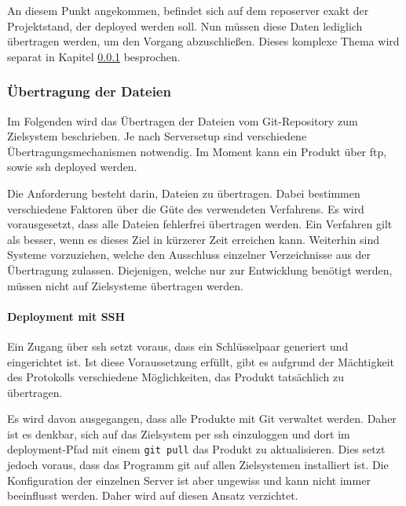 An diesem Punkt angekommen, befindet sich auf dem \gls{reposerver} exakt der Projektstand, der deployed werden soll. Nun müssen diese Daten lediglich übertragen werden, um den Vorgang abzuschließen. Dieses komplexe Thema wird separat in Kapitel \ref{ssub:uebertragung_der_dateien} besprochen.


\subsubsection{Übertragung der Dateien} %
\label{ssub:uebertragung_der_dateien}

Im Folgenden wird das Übertragen der Dateien vom Git-Repository zum Zielsystem beschrieben. Je nach Serversetup sind verschiedene Übertragungsmechanismen notwendig. Im Moment kann ein Produkt über \gls{ftp}, sowie \gls{ssh} deployed werden.

Die Anforderung besteht darin, Dateien zu übertragen. Dabei bestimmen verschiedene Faktoren über die Güte des verwendeten Verfahrens. Es wird vorausgesetzt, dass alle Dateien fehlerfrei übertragen werden. Ein Verfahren gilt als besser, wenn es dieses Ziel in kürzerer Zeit erreichen kann. Weiterhin sind Systeme vorzuziehen, welche den Ausschluss einzelner Verzeichnisse aus der Übertragung zulassen. Diejenigen, welche nur zur Entwicklung benötigt werden, müssen nicht auf Zielsysteme übertragen werden.

\paragraph{Deployment mit SSH} %
\label{par:deployment_mit_ssh}

Ein Zugang über \gls{ssh} setzt voraus, dass ein Schlüsselpaar generiert und eingerichtet ist. Ist diese Voraussetzung erfüllt, gibt es aufgrund der Mächtigkeit des Protokolls verschiedene Möglichkeiten, das Produkt tatsächlich zu übertragen.

Es wird davon ausgegangen, dass alle Produkte mit Git verwaltet werden. Daher ist es denkbar, sich auf das Zielsystem per \gls{ssh} einzuloggen und dort im \Gls{deployment}-Pfad mit einem \lstinline!git pull! das Produkt zu aktualisieren. Dies setzt jedoch voraus, dass das Programm git auf allen Zielsystemen installiert ist. Die Konfiguration der einzelnen Server ist aber ungewiss und kann nicht immer beeinflusst werden. Daher wird auf diesen Ansatz verzichtet.

